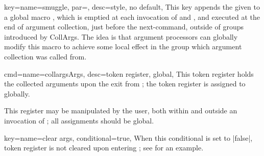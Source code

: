 \documentclass[a4paper,11pt]{article}
\begin{document}
\begin{doc}[%
    pi=\docaux{cmd}{collargsReturn}
  ]
\begin{itemize}
  \end{itemize}
\end{doc}

\begin{doc}[%
    pi=\docaux{cmd}{collargsSmuggle}
  ]{
    key={name=smuggle, par=, desc={style, no default}},
  }
  This key appends the given  to a global macro
  , which is emptied at each invocation of
   and , and executed at
  the end of argument collection, just before the next-command, outside of
   groups introduced by CollArgs. The idea is that argument
  processors can globally modify this macro to achieve some local effect in the
  group which argument collection was called from.
\end{doc}

\begin{doc}{
    cmd={name=collargsArgs, desc={token register, global}},
  }
  This token register holds the collected arguments upon the exit from
  ; the token register is assigned to globally.

  This register may be manipulated by the user, both within and outside an
  invocation of ; all assignments should be global.
\end{doc}

\begin{doc}[
    pi=\docaux{cmd}{ifcollargsClearArgs}
  ]{
    key={name=clear args, conditional=true},
  }
  When this conditional is set to |false|, token register 
  is not cleared upon entering ; see
   for an example.
\end{doc}
\end{document}

